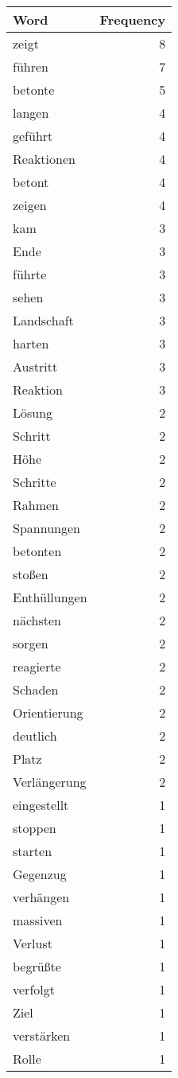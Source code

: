 \begin{tabular}{lr}
\toprule
Word & Frequency \\
\midrule
zeigt & 8 \\
führen & 7 \\
betonte & 5 \\
langen & 4 \\
geführt & 4 \\
Reaktionen & 4 \\
betont & 4 \\
zeigen & 4 \\
kam & 3 \\
Ende & 3 \\
führte & 3 \\
sehen & 3 \\
Landschaft & 3 \\
harten & 3 \\
Austritt & 3 \\
Reaktion & 3 \\
Lösung & 2 \\
Schritt & 2 \\
Höhe & 2 \\
Schritte & 2 \\
Rahmen & 2 \\
Spannungen & 2 \\
betonten & 2 \\
stoßen & 2 \\
Enthüllungen & 2 \\
nächsten & 2 \\
sorgen & 2 \\
reagierte & 2 \\
Schaden & 2 \\
Orientierung & 2 \\
deutlich & 2 \\
Platz & 2 \\
Verlängerung & 2 \\
eingestellt & 1 \\
stoppen & 1 \\
starten & 1 \\
Gegenzug & 1 \\
verhängen & 1 \\
massiven & 1 \\
Verlust & 1 \\
begrüßte & 1 \\
verfolgt & 1 \\
Ziel & 1 \\
verstärken & 1 \\
Rolle & 1 \\

\end{tabular}

